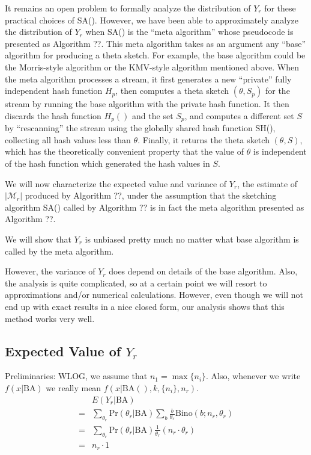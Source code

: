 \documentclass{sig-alternate}
\begin{document}
It remains an open problem to formally analyze the distribution of $Y_r$ for these
practical choices of SA(). However, we have been able to approximately analyze the distribution
of $Y_r$ when SA() is the ``meta algorithm'' whose pseudocode is presented as Algorithm ??.
This meta algorithm takes as an argument any ``base'' algorithm for producing a theta sketch.
For example, the base algorithm could be the Morris-style algorithm or the KMV-style algorithm
mentioned above.  When the meta algorithm processes a stream, it first generates a new ``private''
fully independent hash function $H_p$, then computes a theta sketch $(\theta, S_p)$
for the stream by running the base algorithm with the private hash function. It then discards
the hash function $H_p()$ and the set $S_p$, and computes a different set $S$ by ``rescanning''
the stream using the globally shared hash function SH(), collecting all hash values less than
$\theta$. Finally, it returns the theta sketch $(\theta,S)$, which has the theoretically 
convenient property that the value of $\theta$ is independent of the hash function which
generated the hash values in $S$.

We will now characterize the expected value and variance of $Y_r$, the estimate of $|\mathcal{M}_r|$
produced by Algorithm ??, under the assumption that the sketching algorithm SA() called by
Algorithm ?? is in fact the meta algorithm presented as Algorithm ??.

We will show that $Y_r$ is unbiased pretty much no matter what base algorithm is called by 
the meta algorithm.

However, the variance of $Y_r$ does depend on details of the base algorithm. Also, the analysis
is quite complicated, so at a certain point we will resort to approximations and/or numerical
calculations. However, even though we will not end up with exact results in a nice closed form,
our analysis shows that this method works very well.

\subsection{Expected Value of $Y_r$}

Preliminaries: WLOG, we assume that $n_1 = \max \{n_i\}$. Also, whenever we write
$f(x|\mathrm{BA})$ we really mean $f(x|\mathrm{BA}(),k,\{n_i\},n_r)$.
\begin{align}
   & E(Y_r|\mathrm{BA}) \\
 = & \sum_{\theta_r} \mathrm{Pr}(\theta_r|\mathrm{BA}) \sum_b \frac{b}{\theta_r} \mathrm{Bino}(b;n_r,\theta_r) \\
 = & \sum_{\theta_r} \mathrm{Pr}(\theta_r|\mathrm{BA}) \frac{1}{\theta_r} (n_r \cdot \theta_r) \\
 = & n_r \cdot 1
\end{align}
\end{document}
